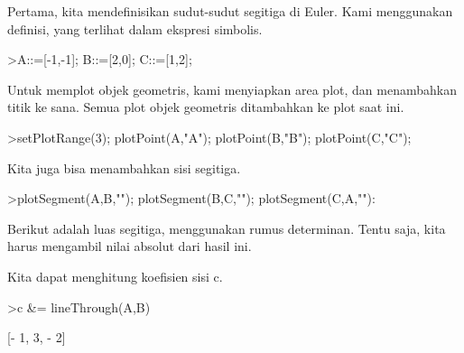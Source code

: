 \documentclass[a4paper,10pt]{article}
\begin{document}
\begin{eulernotebook}
\begin{eulercomment}
\begin{eulercomment}
\begin{eulercomment}
Pertama, kita mendefinisikan sudut-sudut segitiga di Euler. Kami
menggunakan definisi, yang terlihat dalam ekspresi simbolis.
\end{eulercomment}
\begin{eulerprompt}
>A::=[-1,-1]; B::=[2,0]; C::=[1,2];
\end{eulerprompt}
\begin{eulercomment}
Untuk memplot objek geometris, kami menyiapkan area plot, dan
menambahkan titik ke sana. Semua plot objek geometris ditambahkan ke
plot saat ini.
\end{eulercomment}
\begin{eulerprompt}
>setPlotRange(3); plotPoint(A,"A"); plotPoint(B,"B"); plotPoint(C,"C");
\end{eulerprompt}
\begin{eulercomment}
Kita juga bisa menambahkan sisi segitiga.
\end{eulercomment}
\begin{eulerprompt}
>plotSegment(A,B,""); plotSegment(B,C,""); plotSegment(C,A,""):
\end{eulerprompt}
\begin{eulercomment}
Berikut adalah luas segitiga, menggunakan rumus determinan. Tentu
saja, kita harus mengambil nilai absolut dari hasil ini.
\end{eulercomment}
\begin{eulercomment}
Kita dapat menghitung koefisien sisi c.
\end{eulercomment}
\begin{eulerprompt}
>c &= lineThrough(A,B)
\end{eulerprompt}
\begin{euleroutput}
  
                              [- 1, 3, - 2]
  

\end{euleroutput}
\end{eulercomment}
\end{eulercomment}
\end{eulernotebook}
\end{document}
